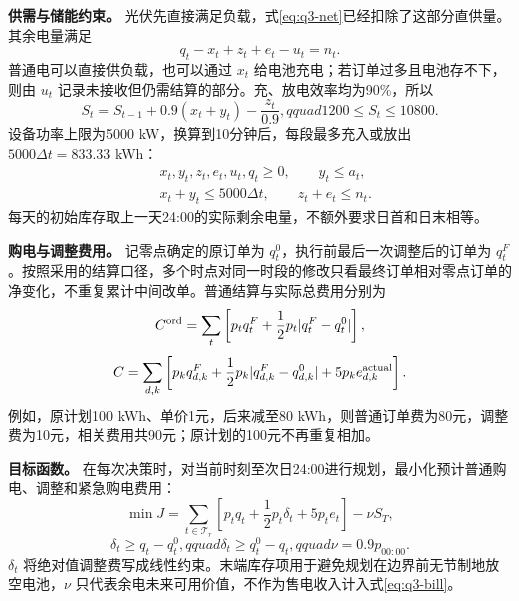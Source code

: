 \textbf{供需与储能约束。} 光伏先直接满足负载，式\eqref{eq:q3-net}已经扣除了这部分直供量。其余电量满足
\begin{equation}
q_t-x_t+z_t+e_t-u_t=n_t.
\label{eq:q3-balance}
\end{equation}
普通电可以直接供负载，也可以通过 $x_t$ 给电池充电；若订单过多且电池存不下，则由 $u_t$ 记录未接收但仍需结算的部分。充、放电效率均为90\%，所以
\begin{equation}
S_t=S_{t-1}+0.9(x_t+y_t)-\frac{z_t}{0.9},qquad
1200\le S_t\le10800.
\label{eq:q3-storage}
\end{equation}
设备功率上限为5000 kW，换算到10分钟后，每段最多充入或放出 $5000\Delta t=833.33$ kWh：
\begin{equation}
\begin{aligned}
&x_t,y_t,z_t,e_t,u_t,q_t\ge0,\qquad y_t\le a_t,\\
&x_t+y_t\le5000\Delta t,\qquad z_t+e_t\le n_t.
\end{aligned}
\label{eq:q3-bounds}
\end{equation}
每天的初始库存取上一天24:00的实际剩余电量，不额外要求日首和日末相等。

\textbf{购电与调整费用。} 记零点确定的原订单为 $q_t^0$，执行前最后一次调整后的订单为 $q_t^F$。按照采用的结算口径，多个时点对同一时段的修改只看最终订单相对零点订单的净变化，不重复累计中间改单。普通结算与实际总费用分别为
\begin{equation}
C^{\rm ord}=\sum_t\left[p_tq_t^F+\frac12p_t|q_t^F-q_t^0|\right],
\label{eq:q3-ordinary}
\end{equation}
\begin{equation}
C=\sum_{d,k}\left[p_kq_{d,k}^F+\frac12p_k|q_{d,k}^F-q_{d,k}^0|
+5p_ke^{\rm actual}_{d,k}\right].
\label{eq:q3-bill}
\end{equation}
例如，原计划100 kWh、单价1元，后来减至80 kWh，则普通订单费为80元，调整费为10元，相关费用共90元；原计划的100元不再重复相加。

\textbf{目标函数。} 在每次决策时，对当前时刻至次日24:00进行规划，最小化预计普通购电、调整和紧急购电费用：
\begin{equation}
\min J=\sum_{t\in\mathcal T_r}
\left[p_tq_t+\frac12p_t\delta_t+5p_te_t\right]-\nu S_T,
\label{eq:q3-objective}
\end{equation}
\begin{equation}
\delta_t\ge q_t-q_t^0,qquad \delta_t\ge q_t^0-q_t,qquad
\nu=0.9p_{00:00}.
\label{eq:q3-absolute}
\end{equation}
$\delta_t$ 将绝对值调整费写成线性约束。末端库存项用于避免规划在边界前无节制地放空电池，$\nu$ 只代表余电未来可用价值，不作为售电收入计入式\eqref{eq:q3-bill}。

